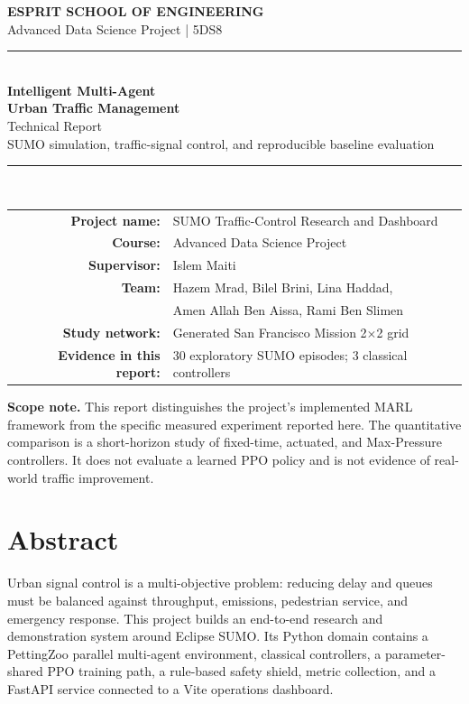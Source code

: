 \documentclass[11pt,a4paper]{article}
\begin{document}
\begin{titlepage}
\thispagestyle{empty}
\centering
\vspace*{1.35cm}
{\large\color{brand}\textbf{ESPRIT SCHOOL OF ENGINEERING}}\\[3pt]
{\normalsize Advanced Data Science Project | 5DS8}\\[1.1cm]
\rule{\textwidth}{1.1pt}\\[9mm]
{\Huge\bfseries\color{brand} Intelligent Multi-Agent\\[3pt] Urban Traffic Management}\\[7mm]
{\Large Technical Report}\\[3mm]
{\large SUMO simulation, traffic-signal control, and reproducible baseline evaluation}\\[9mm]
\rule{\textwidth}{0.55pt}\\[11mm]

\begin{tabular}{>{\bfseries}rl}
Project name: & SUMO Traffic-Control Research and Dashboard \\
Course: & Advanced Data Science Project \\
Supervisor: & Islem Maiti \\
Team: & Hazem Mrad, Bilel Brini, Lina Haddad,\\
      & Amen Allah Ben Aissa, Rami Ben Slimen \\
Study network: & Generated San Francisco Mission 2$\times$2 grid \\
Evidence in this report: & 30 exploratory SUMO episodes; 3 classical controllers \\
\end{tabular}

\vfill
\begin{minipage}{0.88\textwidth}
\small
\textbf{Scope note.} This report distinguishes the project's implemented MARL framework
from the specific measured experiment reported here. The quantitative comparison is a
short-horizon study of fixed-time, actuated, and Max-Pressure controllers. It does not
evaluate a learned PPO policy and is not evidence of real-world traffic improvement.
\end{minipage}
\vspace{12mm}
\end{titlepage}

\section*{Abstract}
Urban signal control is a multi-objective problem: reducing delay and queues must be
balanced against throughput, emissions, pedestrian service, and emergency response.
This project builds an end-to-end research and demonstration system around Eclipse SUMO.
Its Python domain contains a PettingZoo parallel multi-agent environment, classical
controllers, a parameter-shared PPO training path, a rule-based safety shield, metric
collection, and a FastAPI service connected to a Vite operations dashboard.
\end{document}
